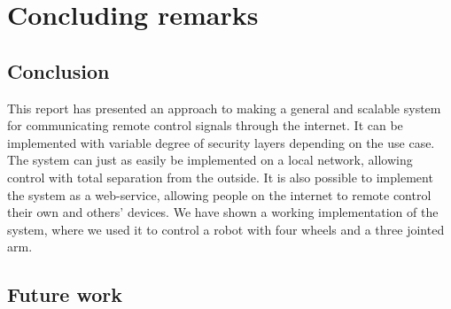 \chapter{Concluding remarks}
\section{Conclusion}
This report has presented an approach to making a general and scalable system for communicating remote control signals through the internet.
It can be implemented with variable degree of security layers depending on the use case.
The system can just as easily be implemented on a local network, allowing control with total separation from the outside. 
It is also possible to implement the system as a web-service, allowing people on the internet to remote control their own and others' devices.
We have shown a working implementation of the system, where we used it to control a robot with four wheels and a three jointed arm.

\section{Future work}


